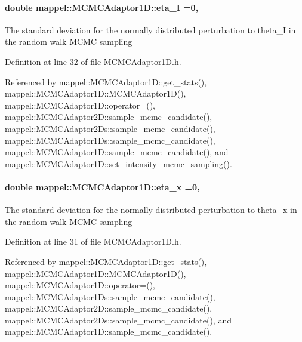 \paragraph[{\texorpdfstring{eta\+\_\+I}{eta_I}}]{\setlength{\rightskip}{0pt plus 5cm}double mappel\+::\+M\+C\+M\+C\+Adaptor1\+D\+::eta\+\_\+I =0\hspace{0.3cm}{\ttfamily [protected]}, {\ttfamily [inherited]}}\hypertarget{classmappel_1_1MCMCAdaptor1D_a5780d326be0c40e10d6c91777cfffbd3}{}\label{classmappel_1_1MCMCAdaptor1D_a5780d326be0c40e10d6c91777cfffbd3}
The standard deviation for the normally distributed perturbation to theta\+\_\+I in the random walk M\+C\+MC sampling 

Definition at line 32 of file M\+C\+M\+C\+Adaptor1\+D.\+h.



Referenced by mappel\+::\+M\+C\+M\+C\+Adaptor1\+D\+::get\+\_\+stats(), mappel\+::\+M\+C\+M\+C\+Adaptor1\+D\+::\+M\+C\+M\+C\+Adaptor1\+D(), mappel\+::\+M\+C\+M\+C\+Adaptor1\+D\+::operator=(), mappel\+::\+M\+C\+M\+C\+Adaptor2\+D\+::sample\+\_\+mcmc\+\_\+candidate(), mappel\+::\+M\+C\+M\+C\+Adaptor2\+Ds\+::sample\+\_\+mcmc\+\_\+candidate(), mappel\+::\+M\+C\+M\+C\+Adaptor1\+Ds\+::sample\+\_\+mcmc\+\_\+candidate(), mappel\+::\+M\+C\+M\+C\+Adaptor1\+D\+::sample\+\_\+mcmc\+\_\+candidate(), and mappel\+::\+M\+C\+M\+C\+Adaptor1\+D\+::set\+\_\+intensity\+\_\+mcmc\+\_\+sampling().

\paragraph[{\texorpdfstring{eta\+\_\+x}{eta_x}}]{\setlength{\rightskip}{0pt plus 5cm}double mappel\+::\+M\+C\+M\+C\+Adaptor1\+D\+::eta\+\_\+x =0\hspace{0.3cm}{\ttfamily [protected]}, {\ttfamily [inherited]}}\hypertarget{classmappel_1_1MCMCAdaptor1D_ae5787e38c9cef6168acf6fc5d3216693}{}\label{classmappel_1_1MCMCAdaptor1D_ae5787e38c9cef6168acf6fc5d3216693}
The standard deviation for the normally distributed perturbation to theta\+\_\+x in the random walk M\+C\+MC sampling 

Definition at line 31 of file M\+C\+M\+C\+Adaptor1\+D.\+h.



Referenced by mappel\+::\+M\+C\+M\+C\+Adaptor1\+D\+::get\+\_\+stats(), mappel\+::\+M\+C\+M\+C\+Adaptor1\+D\+::\+M\+C\+M\+C\+Adaptor1\+D(), mappel\+::\+M\+C\+M\+C\+Adaptor1\+D\+::operator=(), mappel\+::\+M\+C\+M\+C\+Adaptor1\+Ds\+::sample\+\_\+mcmc\+\_\+candidate(), mappel\+::\+M\+C\+M\+C\+Adaptor2\+D\+::sample\+\_\+mcmc\+\_\+candidate(), mappel\+::\+M\+C\+M\+C\+Adaptor2\+Ds\+::sample\+\_\+mcmc\+\_\+candidate(), and mappel\+::\+M\+C\+M\+C\+Adaptor1\+D\+::sample\+\_\+mcmc\+\_\+candidate().


